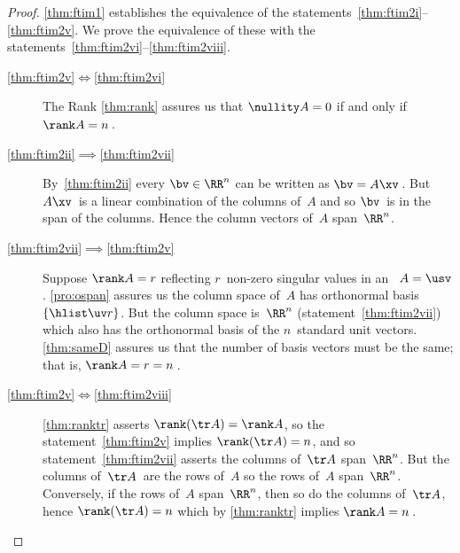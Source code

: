 \begin{proof} 
\autoref{thm:ftim1} establishes the equivalence of the statements~\ref{thm:ftim2i}--\ref{thm:ftim2v}.  
We prove the equivalence of these with the statements~\ref{thm:ftim2vi}--\ref{thm:ftim2viii}.
\begin{description}
\item[\ref{thm:ftim2v}$\iff$\ref{thm:ftim2vi}]
The Rank \autoref{thm:rank} assures us that \(\nullity A=0\) if and only if \(\rank A=n\)\,.
\item[\ref{thm:ftim2ii}$\implies$\ref{thm:ftim2vii}] 
By~\ref{thm:ftim2ii} every \(\bv\in\RR^n\) can be written as \(\bv=A\xv\)\,. But \(A\xv\)~is a linear combination of the columns of~\(A\) and so \(\bv\)~is in the span of the columns.  
Hence the column vectors of~\(A\) span~\(\RR^n\).
\item[\ref{thm:ftim2vii}$\implies$\ref{thm:ftim2v}] 
Suppose \(\rank A=r\) reflecting \(r\)~non-zero singular values in an \svd\ \(A=\usv\).
\autoref{pro:ospan} assures us the column space of~\(A\) has  orthonormal basis~\(\{\hlist\uv r\}\).
But the column space is~\(\RR^n\) (statement~\ref{thm:ftim2vii}) which also has the orthonormal basis of the \(n\)~standard unit vectors.
\autoref{thm:sameD} assures us that the number of basis vectors must be the same; that is, \(\rank A=r=n\)\,.
\item[\ref{thm:ftim2v}$\iff$\ref{thm:ftim2viii}] 
\autoref{thm:ranktr} asserts \(\rank(\tr A)=\rank A\),  so the statement~\ref{thm:ftim2v} implies \(\rank(\tr A)=n\), and so statement~\ref{thm:ftim2vii} asserts the columns of~\(\tr A\) span~\(\RR^n\).
But the columns of~\(\tr A\)\ are the rows of~\(A\) so the rows of~\(A\) span~\(\RR^n\).
Conversely, if the rows of~\(A\) span~\(\RR^n\), then so do the columns of~\(\tr A\), hence \(\rank(\tr A)=n\) which by \autoref{thm:ranktr} implies \(\rank A=n\)\,.
\end{description}
\end{proof}








\sectionExercises



